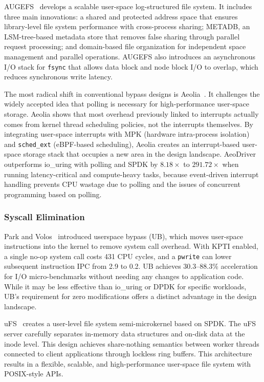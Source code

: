 \documentclass[conference]{IEEEtran}
\begin{document}
AUGEFS~\cite{kim2024augefs} develops a scalable user-space log-structured file system. It includes three main innovations: a shared and protected address space that ensures library-level file system performance with cross-process sharing; METADB, an LSM-tree-based metadata store that removes false sharing through parallel request processing; and domain-based file organization for independent space management and parallel operations. AUGEFS also introduces an asynchronous I/O stack for \texttt{fsync} that allows data block and node block I/O to overlap, which reduces synchronous write latency.

The most radical shift in conventional bypass designs is Aeolia~\cite{zhou2025aeolia}. It challenges the widely accepted idea that polling is necessary for high-performance user-space storage. Aeolia shows that most overhead previously linked to interrupts actually comes from kernel thread scheduling policies, not the interrupts themselves. By integrating user-space interrupts with MPK (hardware intra-process isolation) and \texttt{sched\_ext} (eBPF-based scheduling), Aeolia creates an interrupt-based user-space storage stack that occupies a new area in the design landscape. AeoDriver outperforms io\_uring with polling and SPDK by $8.18\times$ to $291.72\times$ when running latency-critical and compute-heavy tasks, because event-driven interrupt handling prevents CPU wastage due to polling and the issues of concurrent programming based on polling.

\subsubsection{Syscall Elimination}
\label{sec:syscall}

Park and Volos~\cite{park2020bypass} introduced userspace bypass (UB), which moves user-space instructions into the kernel to remove system call overhead. With KPTI enabled, a single no-op system call costs 431 CPU cycles, and a \texttt{pwrite} can lower subsequent instruction IPC from 2.9 to 0.2. UB achieves 30.3--88.3\% acceleration for I/O micro-benchmarks without needing any changes to application code. While it may be less effective than io\_uring or DPDK for specific workloads, UB's requirement for zero modifications offers a distinct advantage in the design landscape.

uFS~\cite{liu2021scale} creates a user-level file system semi-microkernel based on SPDK. The uFS server carefully separates in-memory data structures and on-disk data at the inode level. This design achieves share-nothing semantics between worker threads connected to client applications through lockless ring buffers. This architecture results in a flexible, scalable, and high-performance user-space file system with POSIX-style APIs.
\end{document}
